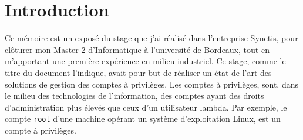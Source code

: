 \section*{Introduction} %

Ce mémoire est un exposé du stage que j'ai réalisé dans l'entreprise Synetis, pour clôturer mon Master 2 d'Informatique à l'université de Bordeaux, tout en m'apportant une première expérience en milieu industriel. Ce stage, comme le titre du document l'indique, 
avait pour but de réaliser un état de l'art des solutions de gestion des comptes à privilèges. Les comptes à privilèges, sont, dans le milieu des technologies de l'information, des comptes ayant des droits d'administration plus élevés que ceux d'un utilisateur lambda. Par exemple, le compte \texttt{root} d'une machine opérant un système d'exploitation Linux, est un compte à privilèges.
